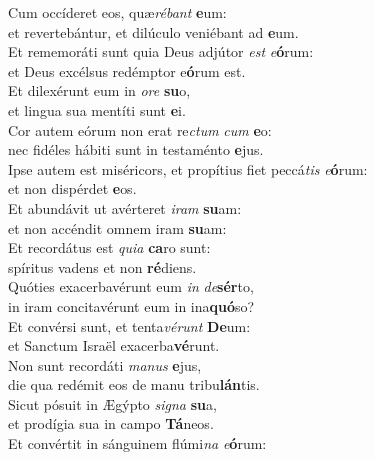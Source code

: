 \evenverse Cum occíderet eos, quæ\textit{ré}\textit{bant} \textbf{e}um:~\*\\
\evenverse et revertebántur, et dilúculo veniébant ad \textbf{e}um.\\
\oddverse Et rememoráti sunt quia Deus adjútor \textit{est} \textit{e}\textbf{ó}rum:~\*\\
\oddverse et Deus excélsus redémptor e\textbf{ó}rum est.\\
\evenverse Et dilexérunt eum in \textit{o}\textit{re} \textbf{su}o,~\*\\
\evenverse et lingua sua mentíti sunt \textbf{e}i.\\
\oddverse Cor autem eórum non erat re\textit{ctum} \textit{cum} \textbf{e}o:~\*\\
\oddverse nec fidéles hábiti sunt in testaménto \textbf{e}jus.\\
\evenverse Ipse autem est miséricors, et propítius fiet peccá\textit{tis} \textit{e}\textbf{ó}rum:~\*\\
\evenverse et non dispérdet \textbf{e}os.\\
\oddverse Et abundávit ut avérteret \textit{i}\textit{ram} \textbf{su}am:~\*\\
\oddverse et non accéndit omnem iram \textbf{su}am:\\
\evenverse Et recordátus est \textit{qui}\textit{a} \textbf{ca}ro sunt:~\*\\
\evenverse spíritus vadens et non \textbf{ré}diens.\\
\oddverse Quóties exacerbavérunt eum \textit{in} \textit{de}\textbf{sér}to,~\*\\
\oddverse in iram concitavérunt eum in ina\textbf{quó}so?\\
\evenverse Et convérsi sunt, et tenta\textit{vé}\textit{runt} \textbf{De}um:~\*\\
\evenverse et Sanctum Israël exacerba\textbf{vé}runt.\\
\oddverse Non sunt recordáti \textit{ma}\textit{nus} \textbf{e}jus,~\*\\
\oddverse die qua redémit eos de manu tribu\textbf{lán}tis.\\
\evenverse Sicut pósuit in Ægýpto \textit{si}\textit{gna} \textbf{su}a,~\*\\
\evenverse et prodígia sua in campo \textbf{Tá}neos.\\
\oddverse Et convértit in sánguinem flúmi\textit{na} \textit{e}\textbf{ó}rum:~\*\\
